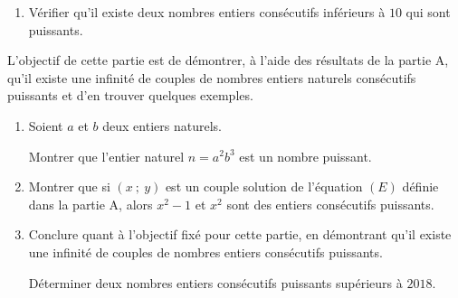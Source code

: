 \documentclass[10pt]{article}
\begin{document}
\medskip

\begin{enumerate}
\item Vérifier qu'il existe deux nombres entiers consécutifs inférieurs à $10$ qui sont puissants.
\end{enumerate}
\medskip

L'objectif de cette partie est de démontrer, à l'aide des résultats de la partie A, qu'il existe une infinité de couples de nombres entiers naturels consécutifs puissants et d'en trouver quelques exemples.

\medskip

\begin{enumerate}[resume]
\item  Soient $a$ et $b$ deux entiers naturels.

Montrer que l'entier naturel $n = a^2 b^3$ est un nombre puissant.
\item  Montrer que si $(x~;~y)$ est un couple solution de l'équation $(E)$ définie dans la partie A, alors $x^2 - 1$ et $x^2$ sont des entiers consécutifs puissants.
\item  Conclure quant à l'objectif fixé pour cette partie, en démontrant qu'il existe une infinité de couples de nombres entiers consécutifs puissants.

Déterminer deux nombres entiers consécutifs puissants supérieurs à $2018$.
\end{enumerate}
\end{document}
